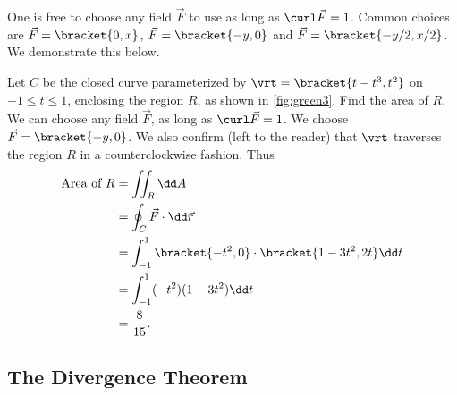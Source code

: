 One is free to choose any field $\vec F$ to use as long as $\curl\vec F = 1$. Common choices are $\vec F =\bracket{0,x}$, $\vec F =\bracket{-y,0}$ and $\vec F =\bracket{-y/2,x/2}$. We demonstrate this below.


\begin{example}\label{ex_green3}
Let $C$ be the closed curve parameterized by $\vrt =\bracket{t-t^3,t^2}$ on $-1\leq t\leq 1$, enclosing the region $R$, as shown in \autoref{fig:green3}. Find the area of $R$.%
\solution
We can choose any field $\vec F$, as long as $\curl \vec F = 1$. We choose $\vec F =\bracket{-y,0}$. We also confirm (left to the reader) that $\vrt$ traverses the region $R$ in a counterclockwise fashion. Thus
\begin{align*}
	\text{Area of $R$}
	&= \iint_R\dd A \\
	&= \oint_C \vec F\cdot\dd\vec r\\
	&= \int_{-1}^1\bracket{-t^2,0}\cdot\bracket{1-3t^2,2t}\dd t\\
	&= \int_{-1}^1 (-t^2)(1-3t^2)\dd t \\
	&= \frac8{15}.
\end{align*}
\end{example}

\subsection{The Divergence Theorem}

